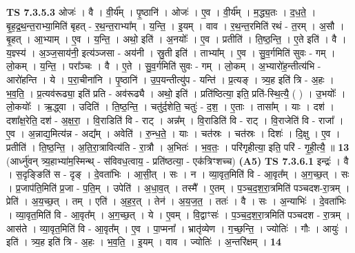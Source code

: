 \documentclass[17pt]{extarticle}
\begin{document}
                  \newline
                                \textbf{ TS 7.3.5.3} \newline
                  ओजः॑ । वै । वी॒र्य᳚म् । पृ॒ष्ठानि॑ । ओजः॑ । ए॒व । वी॒र्य᳚म् । म॒द्ध्य॒तः । द॒ध॒ते॒ । बृ॒ह॒द्र॒थ॒न्त॒राभ्या॒मिति॑ बृहत् - र॒थ॒न्त॒राभ्या᳚म् । य॒न्ति॒ । इ॒यम् । वाव । र॒थ॒न्त॒रमिति॑ रथं - त॒रम् । अ॒सौ । बृ॒हत् । आ॒भ्याम् । ए॒व । य॒न्ति॒ । अथो॒ इति॑ । अ॒नयोः᳚ । ए॒व । प्रतीति॑ । ति॒ष्ठ॒न्ति॒ । ए॒ते इति॑ । वै । य॒ज्ञ्स्य॑ । अ॒ञ्ज॒साय॑नी॒ इत्य॑ञ्जसा - अय॑नी । स्रु॒ती इति॑ । ताभ्या᳚म् । ए॒व । सु॒व॒र्गमिति॑ सुवः - गम् । लो॒कम् । य॒न्ति॒ । परा᳚ञ्चः । वै । ए॒ते । सु॒व॒र्गमिति॑ सुवः - गम् । लो॒कम् । अ॒भ्यारो॑ह॒न्तीत्य॑भि - आरो॑हन्ति । ये । प॒रा॒चीना॑नि । पृ॒ष्ठानि॑ । उ॒प॒यन्तीत्यु॑प - यन्ति॑ । प्र॒त्यङ् । त्र्य॒ह इति॑ त्रि - अ॒हः । भ॒व॒ति॒ । प्र॒त्यव॑रूढ्या॒ इति॑ प्रति - अव॑रूढ्यै । अथो॒ इति॑ । प्रति॑ष्ठित्या॒ इति॒ प्रति॑-स्थि॒त्यै॒ ( ) । उ॒भयोः᳚ । लो॒कयोः᳚ । ऋ॒द्ध्वा । उदिति॑ । ति॒ष्ठ॒न्ति॒ । चतु॑र्द॒शेति॒ चतुः॑ - द॒श॒ । ए॒ताः । तासा᳚म् । याः । दश॑ । दशा᳚क्ष॒रेति॒ दश॑ - अ॒क्ष॒रा॒ । वि॒राडिति॑ वि - राट् । अन्न᳚म् । वि॒राडिति॑ वि - राट् । वि॒राजेति॑ वि - राजा᳚ । ए॒व । अ॒न्नाद्य॒मित्य॑न्न - अद्य᳚म् । अवेति॑ । रु॒न्ध॒ते॒ । याः । चत॑स्रः । चत॑स्रः । दिशः॑ । दि॒क्षु । ए॒व । प्रतीति॑ । ति॒ष्ठ॒न्ति॒ । अ॒ति॒रा॒त्रावित्य॑ति - रा॒त्रौ । अ॒भितः॑ । भ॒व॒तः॒ । परि॑गृहीत्या॒ इति॒ परि॑ - गृ॒ही॒त्यै॒ ॥ \textbf{  13} \newline
                  \newline
                      (आर्ध्नु॑वन् त्र्य॒हाभ्या॑म॒स्मिन्थ् - स॑विवध॒त्वाय॒ - प्रति॑ष्ठत्या॒ - एक॑त्रिꣳशच्च)  \textbf{(A5)} \newline \newline
                                \textbf{ TS 7.3.6.1} \newline
                  इन्द्रः॑ । वै । स॒दृङ्ङिति॑ स - दृङ् । दे॒वता॑भिः । आ॒सी॒त् । सः । न । व्या॒वृत॒मिति॑ वि - आ॒वृत᳚म् । अ॒ग॒च्छ॒त् । सः । प्र॒जाप॑ति॒मिति॑ प्र॒जा - प॒ति॒म् । उपेति॑ । अ॒धा॒व॒त् । तस्मै᳚ । ए॒तम् । प॒ञ्च॒द॒श॒रा॒त्रमिति॑ पञ्चदश-रा॒त्रम् । प्रेति॑ । अ॒य॒च्छ॒त् । तम् । एति॑ । अ॒ह॒र॒त् । तेन॑ । अ॒य॒ज॒त॒ । ततः॑ । वै । सः । अ॒न्याभिः॑ । दे॒वता॑भिः । व्या॒वृत॒मिति॑ वि - आ॒वृत᳚म् । अ॒ग॒च्छ॒त् । ये । ए॒वम् । वि॒द्वाꣳसः॑ । प॒ञ्च॒द॒श॒रा॒त्रमिति॑ पञ्चदश - रा॒त्रम् । आस॑ते । व्या॒वृत॒मिति॑ वि - आ॒वृत᳚म् । ए॒व । पा॒प्मना᳚ । भ्रातृ॑व्येण । ग॒च्छ॒न्ति॒ । ज्योतिः॑ । गौः । आयुः॑ । इति॑ । त्र्य॒ह इति॑ त्रि - अ॒हः । भ॒व॒ति॒ । इ॒यम् । वाव । ज्योतिः॑ । अ॒न्तरि॑क्षम् । \textbf{  14} \newline
                  \newline
\end{document}
